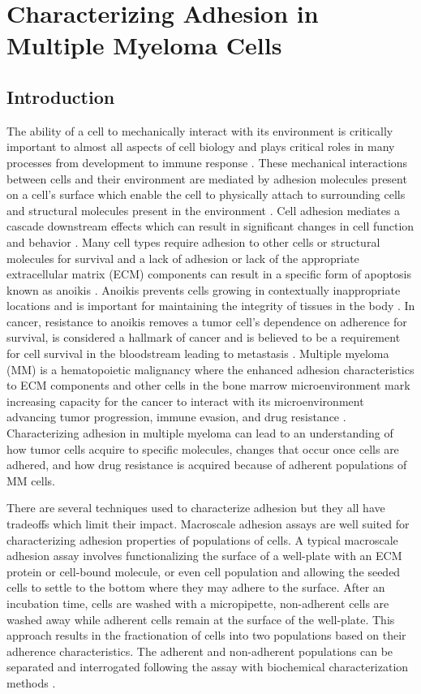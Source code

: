 \chapter{Characterizing Adhesion in Multiple Myeloma Cells}
\label{Chap:Adhesion}

\section{Introduction}The ability of a cell to mechanically interact with its environment is critically important to almost all aspects of cell biology and plays critical roles in many processes from development to immune response \cite{Halbleib2006,Springer1990,Springer1987}. These mechanical interactions between cells and their environment are mediated by adhesion molecules present on a cell's surface which enable the cell to physically attach to surrounding cells and structural molecules present in the environment \cite{Hay2013, Gumbiner1996}. Cell adhesion mediates a cascade downstream effects which can result in significant changes in cell function and behavior \cite{Schlie-Wolter2013}. Many cell types require adhesion to other cells or structural molecules for survival and a lack of adhesion or lack of the appropriate extracellular matrix (ECM) components can result in a specific form of apoptosis known as anoikis \cite{Gilmore2005}. Anoikis prevents cells growing in contextually inappropriate locations and is important for maintaining the integrity of tissues in the body \cite{Gilmore2005}. In cancer, resistance to anoikis removes a tumor cell's dependence on adherence for survival, is considered a hallmark of cancer and is believed to be a requirement for cell survival in the bloodstream leading to metastasis \cite{Paoli20133481}. Multiple myeloma (MM) is a hematopoietic malignancy where the enhanced adhesion characteristics to ECM components and other cells in the bone marrow microenvironment mark increasing capacity for the cancer to interact with its microenvironment advancing tumor progression, immune evasion, and drug resistance \cite{Chauhan1996, Damiano2000, Gorgun2013, Jourdan1998b, Shain2001}. Characterizing adhesion in multiple myeloma can lead to an understanding of how tumor cells acquire to specific molecules, changes that occur once cells are adhered, and how drug resistance is acquired because of adherent populations of MM cells.

There are several techniques used to characterize adhesion but they all have tradeoffs which limit their impact. Macroscale adhesion assays are well suited for characterizing adhesion properties of populations of cells. A typical macroscale adhesion assay involves functionalizing the surface of a well-plate with an ECM protein or cell-bound molecule, or even cell population and allowing the seeded cells to settle to the bottom where they may adhere to the surface. After an incubation time, cells are washed with a micropipette, non-adherent cells are washed away while adherent cells remain at the surface of the well-plate. This approach results in the fractionation of cells into two populations based on their adherence characteristics. The adherent and non-adherent populations can be separated and interrogated following the assay with biochemical characterization methods .

